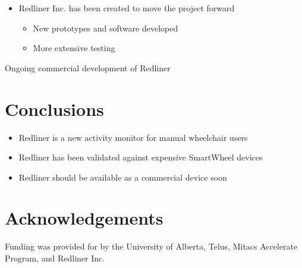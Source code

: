 \documentclass[a0,landscape]{a0poster}
\begin{document}
\begin{multicols*}{3}
\begin{itemize}
    \item Redliner Inc. has been created to move the project forward
    \begin{itemize}
        \item New prototypes and software developed
        \item More extensive testing
    \end{itemize}
\end{itemize}

\noindent
\begin{minipage}{\columnwidth}
\makeatletter
\newcommand{\@captype}{figure}
\makeatother
\centering
{}\qquad%
\caption{Ongoing commercial development of Redliner}
\end{minipage}

\section*{Conclusions}
\begin{itemize}
    \item Redliner is a new activity monitor for manual wheelchair users
    \item Redliner has been validated against expensive SmartWheel devices
    \item Redliner should be available as a commercial device soon
\end{itemize}

\small
\nocite{*}



\section*{Acknowledgements}
Funding was provided for by the University of Alberta, Telus, Mitacs Accelerate Program, and Redliner Inc.

\end{multicols*}
\end{document}
